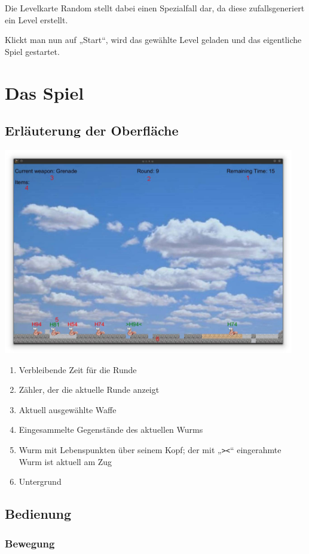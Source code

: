 \documentclass{scrreprt}
\begin{document}
Die Levelkarte Random stellt dabei einen Spezialfall dar, da diese zufallsgeneriert ein Level erstellt.

Klickt man nun auf „Start“, wird das gewählte Level geladen und das eigentliche Spiel gestartet.

\section{Das Spiel}

\subsection{Erläuterung der Oberfläche}

\includegraphics[height=9cm]{Screenshot13.jpg}

\begin{enumerate}
 \item Verbleibende Zeit für die Runde
 \item Zähler, der die aktuelle Runde anzeigt
 \item Aktuell ausgewählte Waffe
 \item Eingesammelte Gegenstände des aktuellen Wurms
 \item Wurm mit Lebenspunkten über seinem Kopf; der mit „\texttt{><}“ eingerahmte Wurm ist aktuell am Zug
 \item Untergrund
\end{enumerate}

\subsection{Bedienung}

\subsubsection{Bewegung}
\end{document}
